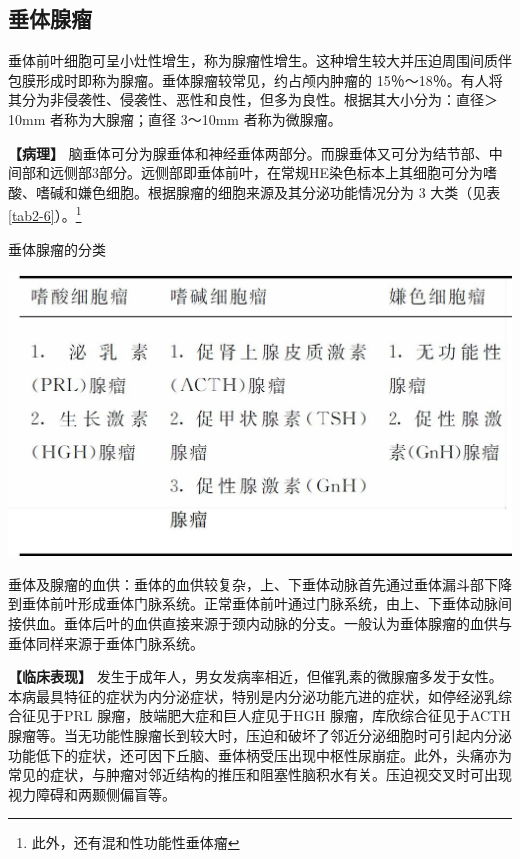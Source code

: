 \subsection{垂体腺瘤}

垂体前叶细胞可呈小灶性增生，称为腺瘤性增生。这种增生较大并压迫周围间质伴包膜形成时即称为腺瘤。垂体腺瘤较常见，约占颅内肿瘤的
15％～18％。有人将其分为非侵袭性、侵袭性、恶性和良性，但多为良性。根据其大小分为：直径＞10mm
者称为大腺瘤；直径 3～10mm 者称为微腺瘤。

\textbf{【病理】}
脑垂体可分为腺垂体和神经垂体两部分。而腺垂体又可分为结节部、中间部和远侧部3部分。远侧部即垂体前叶，在常规HE染色标本上其细胞可分为嗜酸、嗜碱和嫌色细胞。根据腺瘤的细胞来源及其分泌功能情况分为
3 大类（见表\ref{tab2-6}）。\footnote{此外，还有混和性功能性垂体瘤}

\begin{table}[htbp]
\centering
\caption{垂体腺瘤的分类}
\label{tab2-6}
\includegraphics[width=\textwidth,height=\textheight,keepaspectratio]{./images/Image00076.jpg}
\end{table}

垂体及腺瘤的血供：垂体的血供较复杂，上、下垂体动脉首先通过垂体漏斗部下降到垂体前叶形成垂体门脉系统。正常垂体前叶通过门脉系统，由上、下垂体动脉间接供血。垂体后叶的血供直接来源于颈内动脉的分支。一般认为垂体腺瘤的血供与垂体同样来源于垂体门脉系统。

\textbf{【临床表现】}
发生于成年人，男女发病率相近，但催乳素的微腺瘤多发于女性。本病最具特征的症状为内分泌症状，特别是内分泌功能亢进的症状，如停经泌乳综合征见于PRL
腺瘤，肢端肥大症和巨人症见于HGH 腺瘤，库欣综合征见于ACTH
腺瘤等。当无功能性腺瘤长到较大时，压迫和破坏了邻近分泌细胞时可引起内分泌功能低下的症状，还可因下丘脑、垂体柄受压出现中枢性尿崩症。此外，头痛亦为常见的症状，与肿瘤对邻近结构的推压和阻塞性脑积水有关。压迫视交叉时可出现视力障碍和两颞侧偏盲等。

